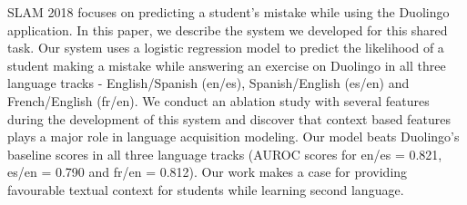 SLAM 2018 focuses on predicting a student's mistake while using the Duolingo application. In this paper, we describe the system we developed for this shared task. Our system uses a logistic regression model to predict the likelihood of a student making a mistake while answering an exercise on Duolingo in all three language tracks - English/Spanish (en/es), Spanish/English (es/en) and French/English (fr/en). We conduct an ablation study with several features during the development of this system and discover that context based features plays a major role in language acquisition modeling.  Our model beats Duolingo's baseline scores in all three language tracks (AUROC scores for en/es = 0.821, es/en = 0.790 and fr/en = 0.812). Our work makes a case for providing favourable textual context for students while learning second language.
